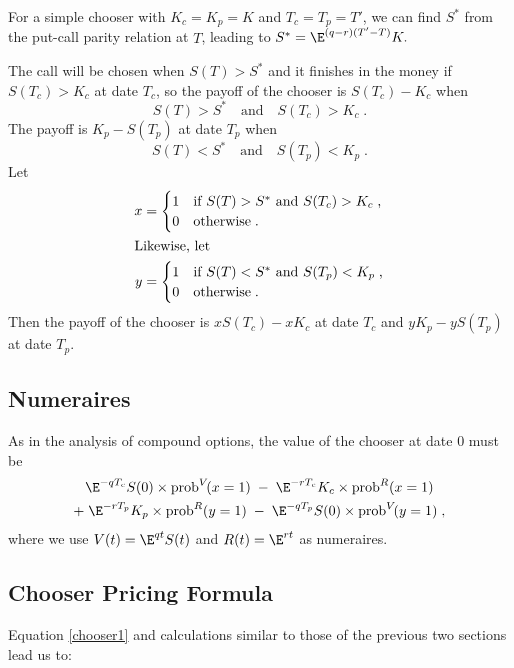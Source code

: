 \noindent For a simple chooser with $K_c=K_p=K$ and $T_c=T_p=T'$, we can find $S^*$ from the put-call parity relation at $T$, leading to $S^*=\E^{(q-r)(T'-T)}K.$

The call will be chosen when $S(T)>S^*$ and it finishes in the money if $S(T_c)>K_c$ at date $T_c$, so the payoff of the chooser is $S(T_c)-K_c$ when 
$$S(T)>S^* \quad \text{and}\quad S(T_c)>K_c\;.
$$
The payoff is $K_p-S(T_p)$ at date $T_p$ when 
$$
S(T)<S^* \quad \text{and}\quad S(T_p)<K_p\;.
$$
Let 
\begin{align*}
x&= \begin{cases} 1 &\text{if $S(T)>S^* $ and $S(T_c)>K_c$\;,}\\
                               0 & \text{otherwise\;.}
        \end{cases}\\
\intertext{Likewise, let}
y&= \begin{cases} 1 &\text{if $S(T)<S^*$ and $S(T_p)<K_p$\;,}\\
                               0 & \text{otherwise\;.}
        \end{cases} 
\end{align*}
Then the payoff of the chooser is $xS(T_c)-xK_c$ at date $T_c$ and $yK_p-yS(T_p)$ at date $T_p$.

\subsection*{Numeraires}
As in the analysis of compound options, the value of the chooser at date 0 must be 
\begin{multline}
\E^{-q T_c}S(0)\times\text{prob}^V\!(x=1) \;- \;\E^{-rT_c}K_c\times\text{prob}^R(x=1)
\\+\; \E^{-rT_p}K_p\times\text{prob}^R(y=1) \;- \;\E^{-q T_p}S(0)\times\text{prob}^V\!(y=1)\;,\label{chooser1}
\end{multline}
where we use $V(t)=\E^{qt}S(t)$ and $R(t)=\E^{rt}$ as numeraires. 

\subsection*{Chooser Pricing Formula}
Equation \eqref{chooser1} and calculations similar to those of the previous two sections lead us to:

